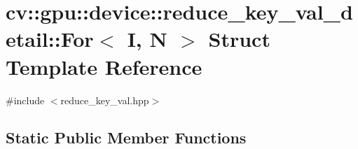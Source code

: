 \hypertarget{structcv_1_1gpu_1_1device_1_1reduce__key__val__detail_1_1For}{\section{cv\-:\-:gpu\-:\-:device\-:\-:reduce\-\_\-key\-\_\-val\-\_\-detail\-:\-:For$<$ I, N $>$ Struct Template Reference}
\label{structcv_1_1gpu_1_1device_1_1reduce__key__val__detail_1_1For}
}


{\ttfamily \#include $<$reduce\-\_\-key\-\_\-val.\-hpp$>$}

\subsection*{Static Public Member Functions}
